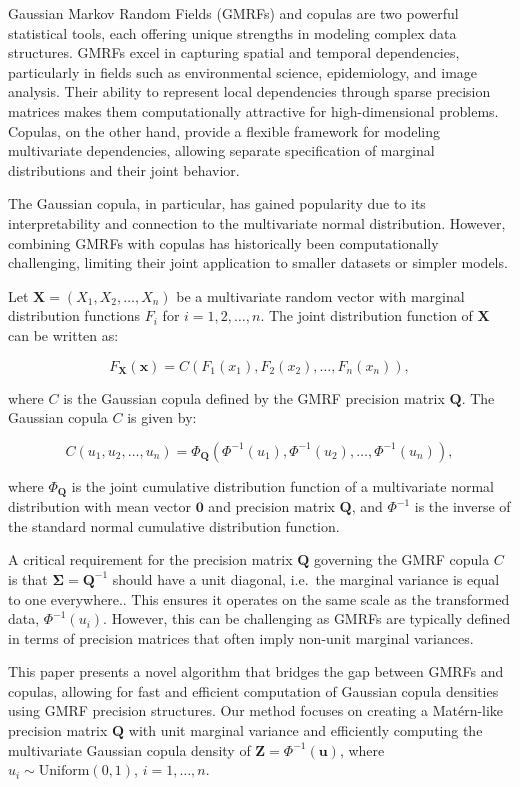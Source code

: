 \documentclass[journal=,manuscript=]{achemso}
\begin{document}
Gaussian Markov Random Fields (GMRFs) and copulas are two powerful
statistical tools, each offering unique strengths in modeling complex
data structures. GMRFs excel in capturing spatial and temporal
dependencies, particularly in fields such as environmental science,
epidemiology, and image analysis. Their ability to represent local
dependencies through sparse precision matrices makes them
computationally attractive for high-dimensional problems. Copulas, on
the other hand, provide a flexible framework for modeling multivariate
dependencies, allowing separate specification of marginal distributions
and their joint behavior.

The Gaussian copula, in particular, has gained popularity due to its
interpretability and connection to the multivariate normal distribution.
However, combining GMRFs with copulas has historically been
computationally challenging, limiting their joint application to smaller
datasets or simpler models.

Let \(\mathbf{X} = (X_1, X_2, \ldots, X_n)\) be a multivariate random
vector with marginal distribution functions \(F_i\) for
\(i = 1, 2, \ldots, n\). The joint distribution function of
\(\mathbf{X}\) can be written as:

\[
F_{\mathbf{X}}(\mathbf{x}) = C(F_1(x_1), F_2(x_2), \ldots, F_n(x_n)),
\]

where \(C\) is the Gaussian copula defined by the GMRF precision matrix
\(\mathbf{Q}\). The Gaussian copula \(C\) is given by:

\[
C(u_1, u_2, \ldots, u_n) = \Phi_\mathbf{Q}(\Phi^{-1}(u_1), \Phi^{-1}(u_2), \ldots, \Phi^{-1}(u_n)),
\]

where \(\Phi_\mathbf{Q}\) is the joint cumulative distribution function
of a multivariate normal distribution with mean vector \(\mathbf{0}\)
and precision matrix \(\mathbf{Q}\), and \(\Phi^{-1}\) is the inverse of
the standard normal cumulative distribution function.

A critical requirement for the precision matrix \(\mathbf{Q}\) governing
the GMRF copula \(C\) is that \(\mathbf{\Sigma} = \mathbf{Q}^{-1}\)
should have a unit diagonal, i.e.~the marginal variance is equal to one
everywhere.. This ensures it operates on the same scale as the
transformed data, \(\Phi^{-1}(u_i)\). However, this can be challenging
as GMRFs are typically defined in terms of precision matrices that often
imply non-unit marginal variances.

This paper presents a novel algorithm that bridges the gap between GMRFs
and copulas, allowing for fast and efficient computation of Gaussian
copula densities using GMRF precision structures. Our method focuses on
creating a Matérn-like precision matrix \(\mathbf{Q}\) with unit
marginal variance and efficiently computing the multivariate Gaussian
copula density of \(\mathbf{Z} = \Phi^{-1}(\mathbf{u})\), where
\(u_i \sim \text{Uniform}(0, 1)\), \(i = 1, \dots, n\).
\end{document}
